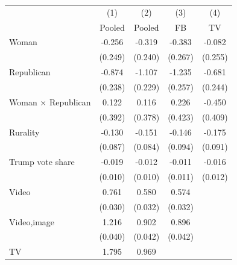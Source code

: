 \begin{tabular}{l*{4}{c}}
\toprule
                    &\multicolumn{1}{c}{(1)}&\multicolumn{1}{c}{(2)}&\multicolumn{1}{c}{(3)}&\multicolumn{1}{c}{(4)}\\
                    &\multicolumn{1}{c}{Pooled}&\multicolumn{1}{c}{Pooled}&\multicolumn{1}{c}{FB}&\multicolumn{1}{c}{TV}\\
\midrule
Woman  &      -0.256         &      -0.319         &      -0.383         &      -0.082         \\
                    &     (0.249)         &     (0.240)         &     (0.267)         &     (0.255)         \\
Republican     &      -0.874\sym{***}&      -1.107\sym{***}&      -1.235\sym{***}&      -0.681\sym{**} \\
                    &     (0.238)         &     (0.229)         &     (0.257)         &     (0.244)         \\
Woman $\times$ Republican&       0.122         &       0.116         &       0.226         &      -0.450         \\
                    &     (0.392)         &     (0.378)         &     (0.423)         &     (0.409)         \\
Rurality      &      -0.130         &      -0.151         &      -0.146         &      -0.175         \\
                    &     (0.087)         &     (0.084)         &     (0.094)         &     (0.091)         \\
Trump vote share              &      -0.019         &      -0.012         &      -0.011         &      -0.016         \\
                    &     (0.010)         &     (0.010)         &     (0.011)         &     (0.012)         \\
Video              &       0.761\sym{***}&       0.580\sym{***}&       0.574\sym{***}&                     \\
                    &     (0.030)         &     (0.032)         &     (0.032)         &                     \\
Video,image         &       1.216\sym{***}&       0.902\sym{***}&       0.896\sym{***}&                     \\
                    &     (0.040)         &     (0.042)         &     (0.042)         &                     \\
TV                  &       1.795\sym{***}&       0.969\sym{***}&                     &                     \\

\end{tabular}
